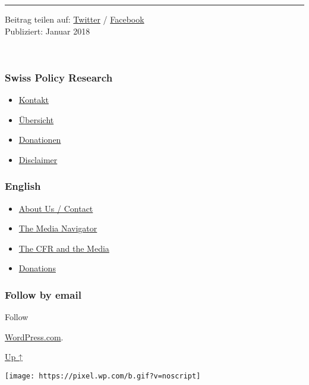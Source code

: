 \begin{center}\rule{0.5\linewidth}{\linethickness}\end{center}

Beitrag teilen auf:
\href{https://twitter.com/intent/tweet?url=https://swprs.org/bericht-eines-journalisten/}{Twitter}
/
\href{https://www.facebook.com/share.php?u=https://swprs.org/bericht-eines-journalisten/}{Facebook}\\
Publiziert: Januar 2018

~

\hypertarget{swiss-policy-research}{%
\subsubsection{Swiss Policy Research}\label{swiss-policy-research}}

\begin{itemize}
\tightlist
\item
  \href{https://swprs.org/kontakt/}{Kontakt}
\item
  \href{https://swprs.org/uebersicht/}{Übersicht}
\item
  \href{https://swprs.org/donationen/}{Donationen}
\item
  \href{https://swprs.org/disclaimer/}{Disclaimer}
\end{itemize}

\hypertarget{english}{%
\subsubsection{English}\label{english}}

\begin{itemize}
\tightlist
\item
  \href{https://swprs.org/contact/}{About Us / Contact}
\item
  \href{https://swprs.org/media-navigator/}{The Media Navigator}
\item
  \href{https://swprs.org/the-american-empire-and-its-media/}{The CFR
  and the Media}
\item
  \href{https://swprs.org/donations/}{Donations}
\end{itemize}

\hypertarget{follow-by-email}{%
\subsubsection{Follow by email}\label{follow-by-email}}

Follow

\href{https://wordpress.com/?ref=footer_custom_com}{WordPress.com}.

\protect\hyperlink{}{Up ↑}

\texttt{[image: https://pixel.wp.com/b.gif?v=noscript]}
